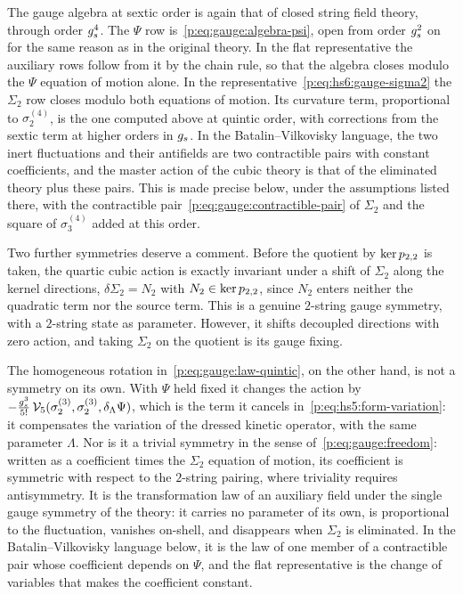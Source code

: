 The gauge algebra at sextic order is again that of closed string field theory, through order $g_s^4$.
  The $\Psi$ row is~\eqref{p:eq:gauge:algebra-psi}, open from order $g_s^2$ on for the same reason as in the original theory.
  In the flat representative the auxiliary rows follow from it by the chain rule, so that the algebra closes modulo the $\Psi$ equation of motion alone.
  In the representative~\eqref{p:eq:hs6:gauge-sigma2} the $\Sigma_2$ row closes modulo both equations of motion.
  Its curvature term, proportional to $\sigma_2^{(4)}$, is the one computed above at quintic order, with corrections from the sextic term at higher orders in $g_s$.
  In the Batalin--Vilkovisky language, the two inert fluctuations and their antifields are two contractible pairs with constant coefficients, and the master action of the cubic theory is that of the eliminated theory plus these pairs.
  This is made precise below, under the assumptions listed there, with the contractible pair~\eqref{p:eq:gauge:contractible-pair} of $\Sigma_2$ and the square of $\sigma_3^{(4)}$ added at this order.

Two further symmetries deserve a comment.
Before the quotient by $\ker p_{2,2}$ is taken, the quartic cubic action is exactly invariant under a shift of $\Sigma_2$ along the kernel directions, $\delta \Sigma_2 = N_2$ with $N_2 \in \ker p_{2,2}$, since $N_2$ enters neither the quadratic term nor the source term.
This is a genuine $2$-string gauge symmetry, with a $2$-string state as parameter.
  However, it shifts decoupled directions with zero action, and taking $\Sigma_2$ on the quotient is its gauge fixing.

The homogeneous rotation in~\eqref{p:eq:gauge:law-quintic}, on the other hand, is not a symmetry on its own.
With $\Psi$ held fixed it changes the action by $- \tfrac{g_s^3}{5!} \, \mathcal{V}_{5}(\sigma_2^{(3)}, \sigma_2^{(3)}, \delta_\Lambda \Psi)$, which is the term it cancels in~\eqref{p:eq:hs5:form-variation}: it compensates the variation of the dressed kinetic operator, with the same parameter $\Lambda$.
Nor is it a trivial symmetry in the sense of~\eqref{p:eq:gauge:freedom}: written as a coefficient times the $\Sigma_2$ equation of motion, its coefficient is symmetric with respect to the $2$-string pairing, where triviality requires antisymmetry.
It is the transformation law of an auxiliary field under the single gauge symmetry of the theory: it carries no parameter of its own, is proportional to the fluctuation, vanishes on-shell, and disappears when $\Sigma_2$ is eliminated.
In the Batalin--Vilkovisky language below, it is the law of one member of a contractible pair whose coefficient depends on $\Psi$, and the flat representative is the change of variables that makes the coefficient constant.

